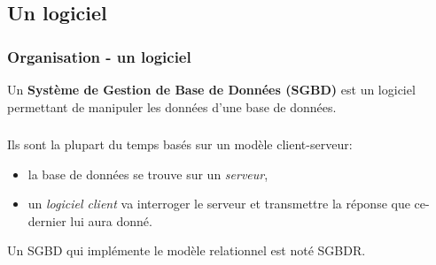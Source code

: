 \documentclass[svgnames,11pt]{beamer}
\begin{document}
\subsection{Un logiciel}
\begin{frame}
    \frametitle{Organisation - un logiciel}

    Un \textbf{Système de Gestion de Base de Données (SGBD)} est un logiciel permettant de manipuler les données d'une base de données.

\end{frame}
\begin{frame}
    \frametitle{}

    Ils sont la plupart du temps basés sur un modèle client-serveur:
    \begin{itemize}
        \item la base de données se trouve sur un \emph{serveur},
        \item un \emph{logiciel client} va interroger le serveur et transmettre la réponse que ce-dernier lui aura donné.
    \end{itemize}
    \begin{aretenir}[Remarque]
        Un SGBD qui implémente le modèle relationnel est noté SGBDR.
    \end{aretenir}
\end{frame}
\end{document}
